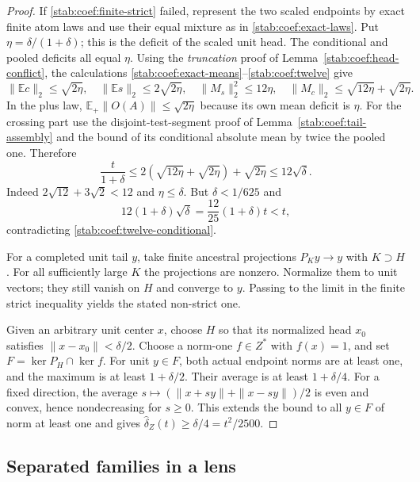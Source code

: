 \begin{proof}
If \eqref{stab:coef:finite-strict} failed, represent the two scaled
endpoints by exact finite atom laws and use their equal mixture as in
\eqref{stab:coef:exact-laws}. Put
$\eta=\delta/(1+\delta)$; this is the deficit of the scaled
unit head. The conditional and pooled deficits all equal $\eta$.
Using the \emph{truncation} proof of
Lemma~\ref{stab:coef:head-conflict}, the calculations
\eqref{stab:coef:exact-means}--\eqref{stab:coef:twelve} give
\[
 \|\mathbb Ec\|_2\le\sqrt{2\eta},\quad
 \|\mathbb Es\|_2\le2\sqrt{2\eta},\quad
 \|M_s\|_2^2\le12\eta,\quad
 \|M_c\|_2\le\sqrt{12\eta}+\sqrt{2\eta}.
\]
In the plus law, $\mathbb E_+\|O(A)\|\le\sqrt{2\eta}$
because its own mean deficit is $\eta$. For the crossing part use
the disjoint-test-segment proof of
Lemma~\ref{stab:coef:tail-assembly} and the bound of its conditional
absolute mean by twice the pooled one. Therefore
\begin{equation}\label{stab:coef:twelve-conditional}
 \frac{t}{1+\delta}
 \le2(\sqrt{12\eta}+\sqrt{2\eta})+\sqrt{2\eta}
 \le12\sqrt\delta.
\end{equation}
Indeed $2\sqrt{12}+3\sqrt2<12$ and $\eta\le\delta$.
But $\delta<1/625$ and
\[
 12(1+\delta)\sqrt\delta
 =\frac{12}{25}(1+\delta)t<t,
\]
contradicting \eqref{stab:coef:twelve-conditional}.

For a completed unit tail $y$, take finite ancestral projections
$P_Ky\to y$ with $K\supset H$. For all sufficiently large $K$
the projections are nonzero. Normalize them to unit vectors;
they still vanish on $H$ and converge to $y$. Passing to the limit
in the finite strict inequality yields the stated non-strict one.

Given an arbitrary unit center $x$, choose $H$ so that its normalized
head $x_0$ satisfies $\|x-x_0\|<\delta/2$. Choose a norm-one
$f\in Z^*$ with $f(x)=1$, and set
$F=\ker P_H\cap\ker f$. For unit $y\in F$, both actual
endpoint norms are at least one, and the maximum is at least
$1+\delta/2$. Their average is at least $1+\delta/4$.
For a fixed direction, the average
$s\mapsto(\|x+sy\|+\|x-sy\|)/2$ is even and convex, hence
nondecreasing for $s\ge0$. This extends the bound to all
$y\in F$ of norm at least one and gives
$\widehat\delta_Z(t)\ge\delta/4=t^2/2500$.
\end{proof}

\subsection{Separated families in a lens}

